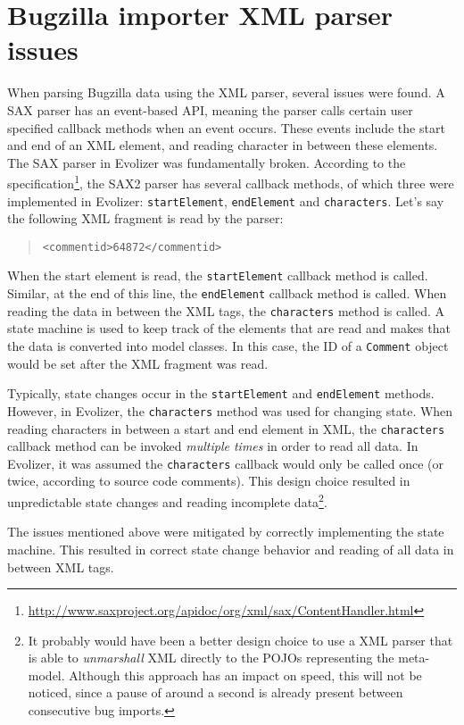 
\chapter{Bugzilla importer XML parser issues} %
\label{cha:bugzilla_importer_xml_parser_issues}
When parsing Bugzilla data using the XML parser, several issues were found. A SAX parser has an event-based API, meaning the parser calls certain user specified callback methods when an event occurs. These events include the start and end of an XML element, and reading character in between these elements. The SAX parser in Evolizer was fundamentally broken. According to the specification\footnote{\url{http://www.saxproject.org/apidoc/org/xml/sax/ContentHandler.html}}, the SAX2 parser has several callback methods, of which three were implemented in Evolizer: \texttt{startElement}, \texttt{endElement} and \texttt{characters}. Let's say the following XML fragment is read by the parser:

\begin{quote}
\texttt{<commentid>64872</commentid>}
\end{quote}

\noindent
When the start element is read, the \texttt{startElement} callback method is called. Similar, at the end of this line, the \texttt{endElement} callback method is called. When reading the data in between the XML tags, the \texttt{characters} method is called. A state machine is used to keep track of the elements that are read and makes that the data is converted into model classes. In this case, the ID of a \texttt{Comment} object would be set after the XML fragment was read. 

Typically, state changes occur in the \texttt{startElement} and \texttt{endElement} methods. However, in Evolizer, the \texttt{characters} method was used for changing state. When reading characters in between a start and end element in XML, the \texttt{characters} callback method can be invoked \emph{multiple times} in order to read all data. In Evolizer, it was assumed the \texttt{characters} callback would only be called once (or twice, according to source code comments). This design choice resulted in unpredictable state changes and reading incomplete data\footnote{It probably would have been a better design choice to use a XML parser that is able to \emph{unmarshall} XML directly to the POJOs representing the meta-model. Although this approach has an impact on speed, this will not be noticed, since a pause of around a second is already present between consecutive bug imports.}.

The issues mentioned above were mitigated by correctly implementing the state machine. This resulted in correct state change behavior and reading of all data in between XML tags.
